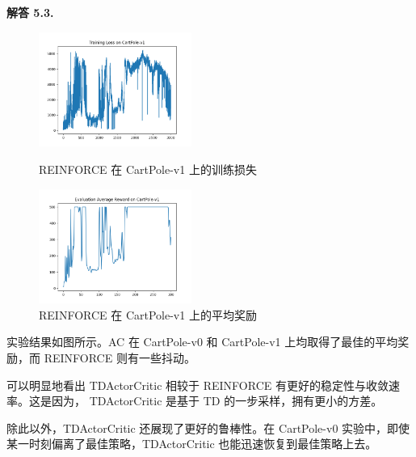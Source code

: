 \documentclass[12pt, a4paper, oneside]{ctexart}
\newenvironment{solution}[1]{\par\noindent\textbf{解答 #1. }\par}{\par}
\begin{document}
\begin{solution}{5.3}
\begin{figure}[htbp]
        \centering
        \begin{minipage}[t]{0.48\textwidth}
        \centering
        \includegraphics[width=5cm]{../code/policy_gradient/figs/Training Loss on CartPole-v1 with algorithm REINFORCE .png}
        \caption{REINFORCE 在 CartPole-v1 上的训练损失}
        \end{minipage}
        \begin{minipage}[t]{0.48\textwidth}
        \centering
        \includegraphics[width=5cm]{../code/policy_gradient/figs/Evaluation Average Reward on CartPole-v1 with algorithm REINFORCE.png}
        \caption{REINFORCE 在 CartPole-v1 上的平均奖励}
        \end{minipage}

    \end{figure}

    实验结果如图所示。AC 在 CartPole-v0 和 CartPole-v1 上均取得了最佳的平均奖励，而 REINFORCE 则有一些抖动。\par
    可以明显地看出 TDActorCritic 相较于 REINFORCE 有更好的稳定性与收敛速率。这是因为， TDActorCritic 是基于 TD 的一步采样，拥有更小的方差。\par
    除此以外，TDActorCritic 还展现了更好的鲁棒性。在 CartPole-v0 实验中，即使某一时刻偏离了最佳策略，TDActorCritic 也能迅速恢复到最佳策略上去。
\end{solution}
\end{document}
